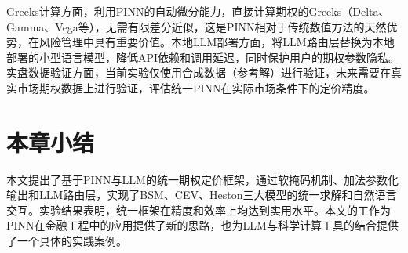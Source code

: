 Greeks计算方面，利用PINN的自动微分能力，直接计算期权的Greeks（Delta、Gamma、Vega等），无需有限差分近似，这是PINN相对于传统数值方法的天然优势，在风险管理中具有重要价值。本地LLM部署方面，将LLM路由层替换为本地部署的小型语言模型，降低API依赖和调用延迟，同时保护用户的期权参数隐私。实盘数据验证方面，当前实验仅使用合成数据（参考解）进行验证，未来需要在真实市场期权数据上进行验证，评估统一PINN在实际市场条件下的定价精度。

\section{本章小结}\label{sec:conclusion_summary}

本文提出了基于PINN与LLM的统一期权定价框架，通过软掩码机制、加法参数化输出和LLM路由层，实现了BSM、CEV、Heston三大模型的统一求解和自然语言交互。实验结果表明，统一框架在精度和效率上均达到实用水平。本文的工作为PINN在金融工程中的应用提供了新的思路，也为LLM与科学计算工具的结合提供了一个具体的实践案例。
